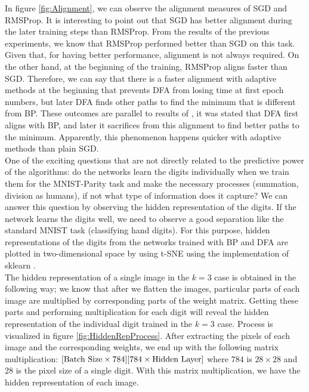 \documentclass[a4paper, nobind]{templates/ociamthesis}
\begin{document}
\noindent In figure \ref{fig:Alignment}, we can observe the alignment measures of SGD and RMSProp. It is interesting to point out that SGD has better alignment during the later training steps than RMSProp. From the results of the previous experiments, we know that RMSProp performed better than SGD on this task. Given that, for having better performance, alignment is not always required. On the other hand, at the beginning of the training, RMSProp aligns faster than SGD. Therefore, we can say that there is a faster alignment with adaptive methods at the beginning that prevents DFA from losing time at first epoch numbers, but later DFA finds other paths to find the minimum that is different from BP. These outcomes are parallel to results of \cite{refinetti2021align}, it was stated that DFA first aligns with BP, and later it sacrifices from this alignment to find better paths to the minimum. Apparently, this phenomenon happens quicker with adaptive methods than plain SGD.\\
\noindent One of the exciting questions that are not directly related to the predictive power of the algorithms: do the networks learn the digits individually when we train them for the MNIST-Parity task and make the necessary processes (summation, division as humans), if not what type of information does it capture? We can answer this question by observing the hidden representation of the digits. If the network learns the digits well, we need to observe a good separation like the standard MNIST task (classifying hand digits). For this purpose, hidden representations of the digits from the networks trained with BP and DFA are plotted in two-dimensional space by using t-SNE using the implementation of sklearn \cite{scikit-learn}.\\
The hidden representation of a single image in the \(k=3\) case is obtained in the following way; we know that after we flatten the images, particular parts of each image are multiplied by corresponding parts of the weight matrix. Getting these parts and performing multiplication for each digit will reveal the hidden representation of the individual digit trained in the \(k=3\) case. Process is visualized in figure \ref{fig:HiddenRepProcess}. After extracting the pixels of each image and the corresponding weights, we end up with the following matrix multiplication: \([\text{Batch Size} \times 784] [784 \space \times \space \text{Hidden Layer}]\) where \(784\) is \(28 \times 28\) and \(28\) is the pixel size of a single digit. With this matrix multiplication, we have the hidden representation of each image.
\end{document}
